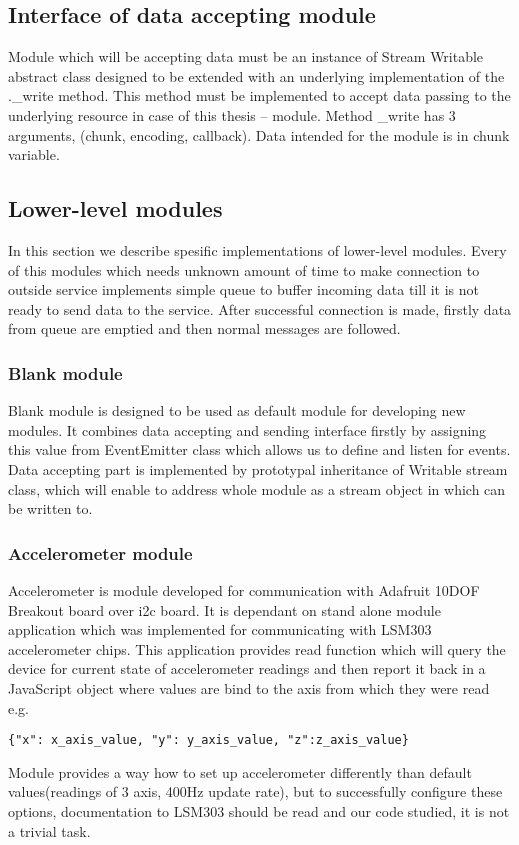 \subsection{Interface of data accepting module} %
\label{ssub:interface_of_data_accepting_module}
Module which will be accepting data must be an instance of Stream Writable abstract class designed to be extended with an underlying implementation of the .\_write method. This method must be implemented to accept data passing to the underlying resource in case of this thesis -- module. Method \_write  has 3 arguments, (chunk, encoding, callback). Data intended for the module is in chunk variable.
\subsection{Lower-level modules} %
\label{sub:lower_level_modules}
In this section we describe spesific implementations of lower-level modules. Every of this modules which needs unknown amount of time to make connection to outside service implements simple queue to buffer incoming data till it is not ready to send data to the service. After successful connection is made, firstly data from queue are emptied and then normal messages are followed.
\subsubsection{Blank module} %
\label{ssub:blank_module}
Blank module is designed to be used as default module for developing new modules. It combines data accepting and sending interface firstly by assigning this value from EventEmitter class which allows us to define and listen for events. Data accepting part is implemented by prototypal inheritance of Writable stream class, which will enable to address whole module as a stream object in which can be written to.
\subsubsection{Accelerometer module} %
\label{ssub:accelerometer_module}
Accelerometer is module developed for communication with Adafruit 10DOF Breakout board over \gls{i2c} board. It is dependant on stand alone module application which was implemented for communicating with LSM303 accelerometer chips. This application provides read function which will query the device for current state of accelerometer readings and then report it back in a JavaScript object where values are bind to the axis from which they were read e.g.
\begin{verbatim}{"x": x_axis_value, "y": y_axis_value, "z":z_axis_value}\end{verbatim}
Module provides a way how to set up accelerometer differently than default values(readings of 3 axis, 400Hz update rate), but to successfully configure these options, documentation to LSM303 should be read and our code studied, it is not a trivial task.
